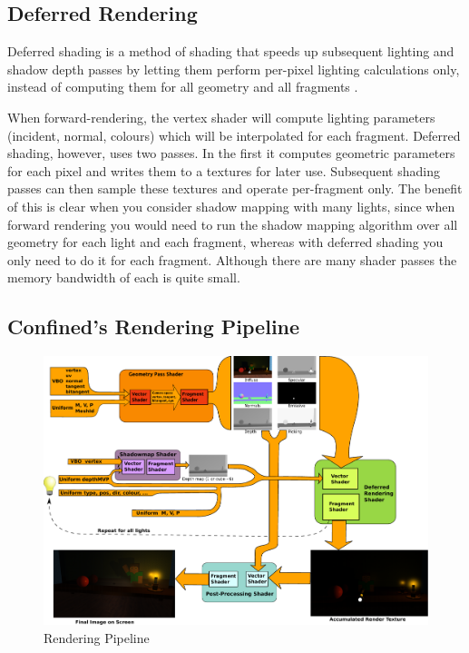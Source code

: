 \documentclass[oneside]{book}
\begin{document}
    \subsection{Deferred Rendering} \label{deferred-rendering}
      Deferred shading is a method of shading that speeds up subsequent lighting and shadow depth passes by letting them perform per-pixel lighting calculations only, instead of computing them for all geometry and all fragments \cite{ferkoreal}.

      When forward-rendering, the vertex shader will compute lighting parameters (incident, normal, colours) which will be interpolated for each fragment. Deferred shading, however, uses two passes. In the first it computes geometric parameters for each pixel and writes them to a textures for later use. Subsequent shading passes can then sample these textures and operate per-fragment only. The benefit of this is clear when you consider shadow mapping with many lights, since when forward rendering you would need to run the shadow mapping algorithm over all geometry for each light and each fragment, whereas with deferred shading you only need to do it for each fragment. Although there are many shader passes the memory bandwidth of each is quite small.


    \subsection{Confined's Rendering Pipeline}
      \begin{figure}[h!]
        \centering
        \includegraphics[width=1.0\textwidth]{rendering_pipeline}
        \caption{Rendering Pipeline}
        \label{pipeline-img}
      \end{figure}
\end{document}
